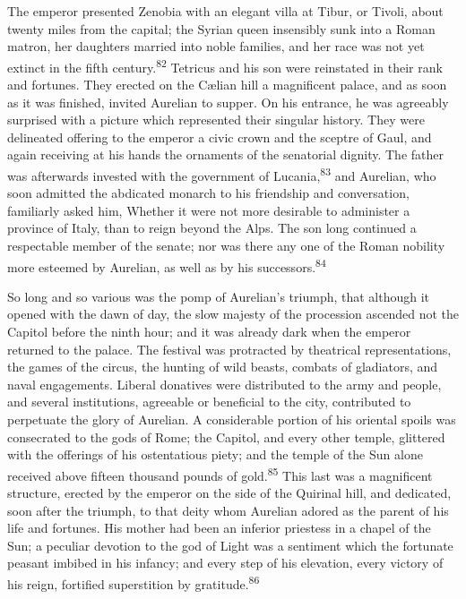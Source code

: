 The emperor presented Zenobia with an elegant villa at Tibur, or
Tivoli, about twenty miles from the capital; the Syrian queen
insensibly sunk into a Roman matron, her daughters married into
noble families, and her race was not yet extinct in the fifth
century.\textsuperscript{82} Tetricus and his son were reinstated in their rank
and fortunes. They erected on the Cælian hill a magnificent
palace, and as soon as it was finished, invited Aurelian to
supper. On his entrance, he was agreeably surprised with a
picture which represented their singular history. They were
delineated offering to the emperor a civic crown and the sceptre
of Gaul, and again receiving at his hands the ornaments of the
senatorial dignity. The father was afterwards invested with the
government of Lucania,\textsuperscript{83} and Aurelian, who soon admitted the
abdicated monarch to his friendship and conversation, familiarly
asked him, Whether it were not more desirable to administer a
province of Italy, than to reign beyond the Alps. The son long
continued a respectable member of the senate; nor was there any
one of the Roman nobility more esteemed by Aurelian, as well as
by his successors.\textsuperscript{84}




So long and so various was the pomp of Aurelian’s triumph, that
although it opened with the dawn of day, the slow majesty of the
procession ascended not the Capitol before the ninth hour; and it
was already dark when the emperor returned to the palace. The
festival was protracted by theatrical representations, the games
of the circus, the hunting of wild beasts, combats of gladiators,
and naval engagements. Liberal donatives were distributed to the
army and people, and several institutions, agreeable or
beneficial to the city, contributed to perpetuate the glory of
Aurelian. A considerable portion of his oriental spoils was
consecrated to the gods of Rome; the Capitol, and every other
temple, glittered with the offerings of his ostentatious piety;
and the temple of the Sun alone received above fifteen thousand
pounds of gold.\textsuperscript{85} This last was a magnificent structure, erected
by the emperor on the side of the Quirinal hill, and dedicated,
soon after the triumph, to that deity whom Aurelian adored as the
parent of his life and fortunes. His mother had been an inferior
priestess in a chapel of the Sun; a peculiar devotion to the god
of Light was a sentiment which the fortunate peasant imbibed in
his infancy; and every step of his elevation, every victory of
his reign, fortified superstition by gratitude.\textsuperscript{86}

